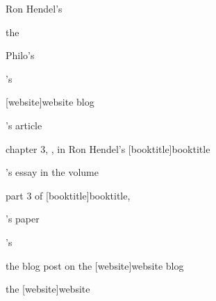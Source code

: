 \documentclass[a4paper]{article}
\begin{document}
\begin{verbcite}
  Ron Hendel's 
\end{verbcite}
\begin{verbcite}
  the 
\end{verbcite}
\begin{verbcite}
  Philo's 
\end{verbcite}
\begin{verbcite}
  \citeauthor{scorsese:aviator}'s 
\end{verbcite}
\begin{verbcite}
  [website]{website} blog
\end{verbcite}
\begin{verbcite}
  \citeauthor{mckenzie:2010}'s  article
\end{verbcite}
\begin{verbcite}
  chapter 3, , in Ron Hendel's
  [booktitle]{booktitle}
\end{verbcite}
\begin{verbcite}
  \citeauthor{aymer:2016}'s essay  in the volume
\end{verbcite}
\begin{verbcite}
  part 3 of [booktitle]{booktitle},
\end{verbcite}
\begin{verbcite}
  \citeauthor{yee:2015}'s paper 
\end{verbcite}
\begin{verbcite}
  \citeauthor{ames:1998}'s 
\end{verbcite}
\begin{verbcite}
  the blog post  on the
  [website]{website} blog
\end{verbcite}
\begin{verbcite}
\end{verbcite}
\begin{verbcite}
\end{verbcite}
\begin{verbcite}
  the [website]{website}
\end{verbcite}
\exampleancientsources
\examplesecondarysources
\examplebibliography
\end{document}
